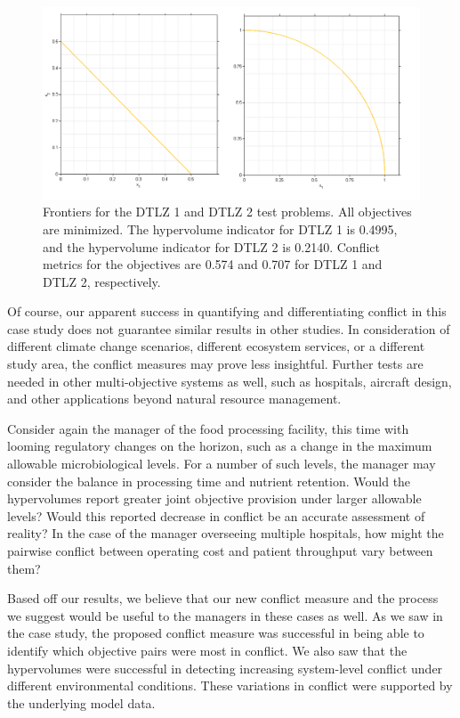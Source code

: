 \begin{figure}[ht]
\centering
\includegraphics[width=.9\textwidth]{../images/DTLZFrontiers_1and2}
\caption[Frontiers of the DTLZ 1 and DTLZ 2 test problems]{Frontiers for the DTLZ 1 and DTLZ 2 test problems. All objectives are minimized. The hypervolume indicator for DTLZ 1 is 0.4995, and the hypervolume indicator for DTLZ 2 is 0.2140. Conflict metrics for the objectives are 0.574 and 0.707 for DTLZ 1 and DTLZ 2, respectively.}
\label{fig:dtlzFrontiers}
\end{figure}

Of course, our apparent success in quantifying and differentiating conflict in this case study does not guarantee similar results in other studies. In consideration of different climate change scenarios, different ecosystem services, or a different study area, the conflict measures may prove less insightful. Further tests are needed in other multi-objective systems as well, such as hospitals, aircraft design, and other applications beyond natural resource management.

Consider again the manager of the food processing facility, this time with looming regulatory changes on the horizon, such as a change in the maximum allowable microbiological levels. For a number of such levels, the manager may consider the balance in processing time and nutrient retention. Would the hypervolumes report greater joint objective provision under larger allowable levels? Would this reported decrease in conflict be an accurate assessment of reality? In the case of the manager overseeing multiple hospitals, how might the pairwise conflict between operating cost and patient throughput vary between them?

Based off our results, we believe that our new conflict measure and the process we suggest would be useful to the managers in these cases as well. As we saw in the case study, the proposed conflict measure was successful in being able to identify which objective pairs were most in conflict. We also saw that the hypervolumes were successful in detecting increasing system-level conflict under different environmental conditions. These variations in conflict were supported by the underlying model data. 


